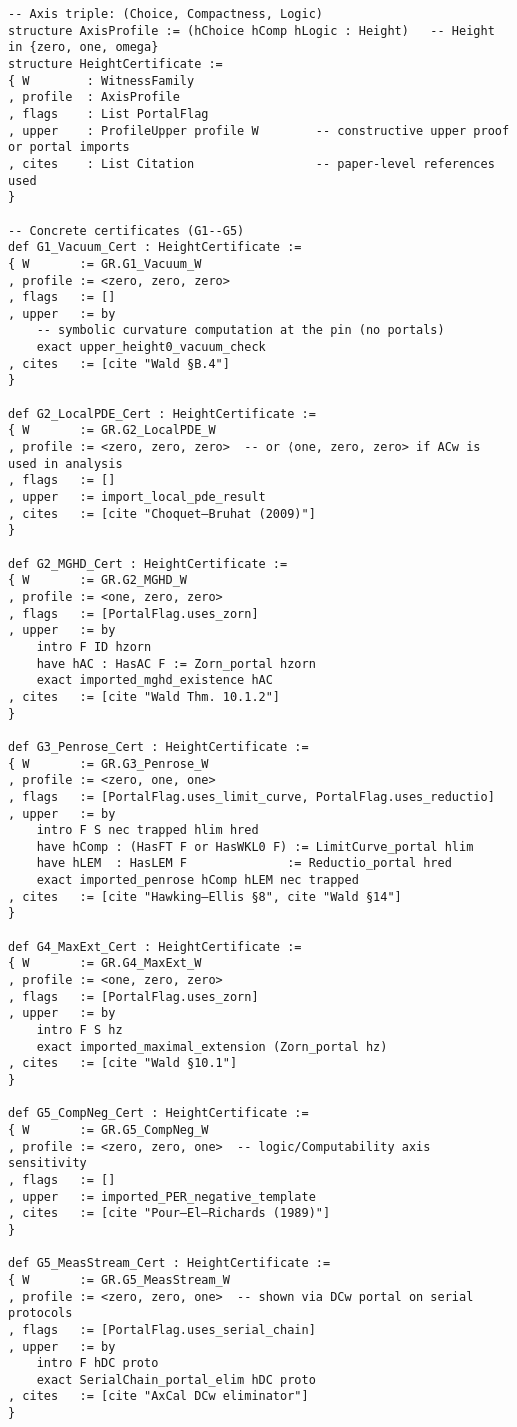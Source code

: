 \documentclass[11pt]{article}
\theoremstyle{definition}
\theoremstyle{remark}
\begin{document}
\begin{verbatim}
-- Axis triple: (Choice, Compactness, Logic)
structure AxisProfile := (hChoice hComp hLogic : Height)   -- Height in {zero, one, omega}
structure HeightCertificate :=
{ W        : WitnessFamily
, profile  : AxisProfile
, flags    : List PortalFlag
, upper    : ProfileUpper profile W        -- constructive upper proof or portal imports
, cites    : List Citation                 -- paper-level references used
}

-- Concrete certificates (G1--G5)
def G1_Vacuum_Cert : HeightCertificate :=
{ W       := GR.G1_Vacuum_W
, profile := <zero, zero, zero>
, flags   := []
, upper   := by
    -- symbolic curvature computation at the pin (no portals)
    exact upper_height0_vacuum_check
, cites   := [cite "Wald §B.4"]
}

def G2_LocalPDE_Cert : HeightCertificate :=
{ W       := GR.G2_LocalPDE_W
, profile := <zero, zero, zero>  -- or ⟨one, zero, zero> if ACw is used in analysis
, flags   := []
, upper   := import_local_pde_result
, cites   := [cite "Choquet–Bruhat (2009)"]
}

def G2_MGHD_Cert : HeightCertificate :=
{ W       := GR.G2_MGHD_W
, profile := <one, zero, zero>
, flags   := [PortalFlag.uses_zorn]
, upper   := by
    intro F ID hzorn
    have hAC : HasAC F := Zorn_portal hzorn
    exact imported_mghd_existence hAC
, cites   := [cite "Wald Thm. 10.1.2"]
}

def G3_Penrose_Cert : HeightCertificate :=
{ W       := GR.G3_Penrose_W
, profile := <zero, one, one>
, flags   := [PortalFlag.uses_limit_curve, PortalFlag.uses_reductio]
, upper   := by
    intro F S nec trapped hlim hred
    have hComp : (HasFT F or HasWKL0 F) := LimitCurve_portal hlim
    have hLEM  : HasLEM F              := Reductio_portal hred
    exact imported_penrose hComp hLEM nec trapped
, cites   := [cite "Hawking–Ellis §8", cite "Wald §14"]
}

def G4_MaxExt_Cert : HeightCertificate :=
{ W       := GR.G4_MaxExt_W
, profile := <one, zero, zero>
, flags   := [PortalFlag.uses_zorn]
, upper   := by
    intro F S hz
    exact imported_maximal_extension (Zorn_portal hz)
, cites   := [cite "Wald §10.1"]
}

def G5_CompNeg_Cert : HeightCertificate :=
{ W       := GR.G5_CompNeg_W
, profile := <zero, zero, one>  -- logic/Computability axis sensitivity
, flags   := []
, upper   := imported_PER_negative_template
, cites   := [cite "Pour–El–Richards (1989)"]
}

def G5_MeasStream_Cert : HeightCertificate :=
{ W       := GR.G5_MeasStream_W
, profile := <zero, zero, one>  -- shown via DCw portal on serial protocols
, flags   := [PortalFlag.uses_serial_chain]
, upper   := by
    intro F hDC proto
    exact SerialChain_portal_elim hDC proto
, cites   := [cite "AxCal DCw eliminator"]
}
\end{verbatim}
\end{document}
